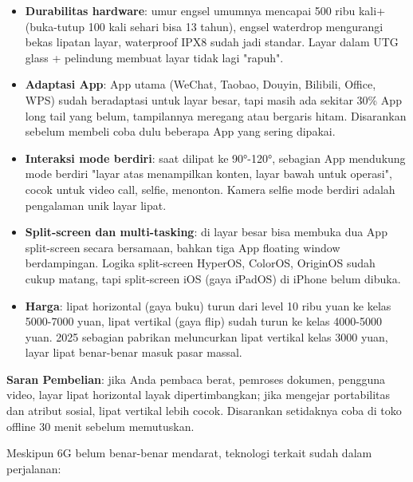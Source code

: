 \begin{itemize}
  \item \textbf{Durabilitas hardware}: umur engsel umumnya mencapai 500 ribu kali+ (buka-tutup 100 kali sehari bisa 13 tahun), engsel waterdrop mengurangi bekas lipatan layar, waterproof IPX8 sudah jadi standar. Layar dalam UTG glass + pelindung membuat layar tidak lagi "rapuh".
  \item \textbf{Adaptasi App}: App utama (WeChat, Taobao, Douyin, Bilibili, Office, WPS) sudah beradaptasi untuk layar besar, tapi masih ada sekitar 30\% App long tail yang belum, tampilannya meregang atau bergaris hitam. Disarankan sebelum membeli coba dulu beberapa App yang sering dipakai.
  \item \textbf{Interaksi mode berdiri}: saat dilipat ke 90°-120°, sebagian App mendukung mode berdiri "layar atas menampilkan konten, layar bawah untuk operasi", cocok untuk video call, selfie, menonton. Kamera selfie mode berdiri adalah pengalaman unik layar lipat.
  \item \textbf{Split-screen dan multi-tasking}: di layar besar bisa membuka dua App split-screen secara bersamaan, bahkan tiga App floating window berdampingan. Logika split-screen HyperOS, ColorOS, OriginOS sudah cukup matang, tapi split-screen iOS (gaya iPadOS) di iPhone belum dibuka.
  \item \textbf{Harga}: lipat horizontal (gaya buku) turun dari level 10 ribu yuan ke kelas 5000-7000 yuan, lipat vertikal (gaya flip) sudah turun ke kelas 4000-5000 yuan. 2025 sebagian pabrikan meluncurkan lipat vertikal kelas 3000 yuan, layar lipat benar-benar masuk pasar massal.
\end{itemize}

\textbf{Saran Pembelian}: jika Anda pembaca berat, pemroses dokumen, pengguna video, layar lipat horizontal layak dipertimbangkan; jika mengejar portabilitas dan atribut sosial, lipat vertikal lebih cocok. Disarankan setidaknya coba di toko offline 30 menit sebelum memutuskan.


Meskipun 6G belum benar-benar mendarat, teknologi terkait sudah dalam perjalanan:

